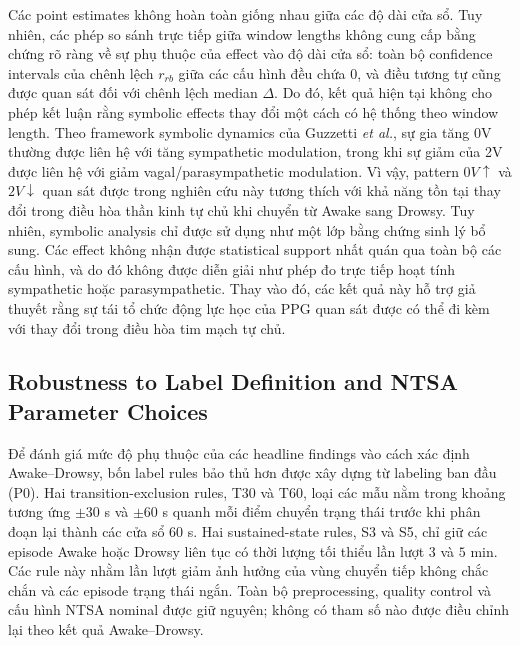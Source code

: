 Các point estimates không hoàn toàn giống nhau giữa các độ dài cửa sổ. Tuy nhiên, các phép so sánh trực tiếp giữa window lengths không cung cấp bằng chứng rõ ràng về sự phụ thuộc của effect vào độ dài cửa sổ: toàn bộ confidence intervals của chênh lệch $r_{rb}$ giữa các cấu hình đều chứa $0$, và điều tương tự cũng được quan sát đối với chênh lệch median $\Delta$. Do đó, kết quả hiện tại không cho phép kết luận rằng symbolic effects thay đổi một cách có hệ thống theo window length. Theo framework symbolic dynamics của Guzzetti \textit{et al.}, sự gia tăng 0V thường được liên hệ với tăng sympathetic modulation, trong khi sự giảm của 2V được liên hệ với giảm vagal/parasympathetic modulation. Vì vậy, pattern $0V\uparrow$ và $2V\downarrow$ quan sát được trong nghiên cứu này tương thích với khả năng tồn tại thay đổi trong điều hòa thần kinh tự chủ khi chuyển từ Awake sang Drowsy. Tuy nhiên, symbolic analysis chỉ được sử dụng như một lớp bằng chứng sinh lý bổ sung. Các effect không nhận được statistical support nhất quán qua toàn bộ các cấu hình, và do đó không được diễn giải như phép đo trực tiếp hoạt tính sympathetic hoặc parasympathetic. Thay vào đó, các kết quả này hỗ trợ giả thuyết rằng sự tái tổ chức động lực học của PPG quan sát được có thể đi kèm với thay đổi trong điều hòa tim mạch tự chủ.

\subsection{Robustness to Label Definition and NTSA Parameter Choices}

Để đánh giá mức độ phụ thuộc của các headline findings vào cách xác định Awake--Drowsy, bốn label rules bảo thủ hơn được xây dựng từ labeling ban đầu (P0). Hai transition-exclusion rules, T30 và T60, loại các mẫu nằm trong khoảng tương ứng $\pm30$ s và $\pm60$ s quanh mỗi điểm chuyển trạng thái trước khi phân đoạn lại thành các cửa sổ $60$ s. Hai sustained-state rules, S3 và S5, chỉ giữ các episode Awake hoặc Drowsy liên tục có thời lượng tối thiểu lần lượt $3$ và $5$ min. Các rule này nhằm lần lượt giảm ảnh hưởng của vùng chuyển tiếp không chắc chắn và các episode trạng thái ngắn. Toàn bộ preprocessing, quality control và cấu hình NTSA nominal được giữ nguyên; không có tham số nào được điều chỉnh lại theo kết quả Awake--Drowsy.

